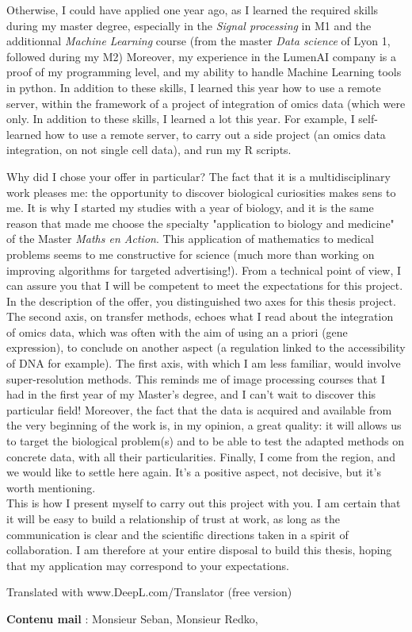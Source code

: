 \documentclass[a4paper,12pt]{article}
\begin{document}
Otherwise, I could have applied one year ago, as I learned the required skills during my master degree, especially in the \textit{Signal processing} in M1 and the additionnal \textit{Machine Learning} course (from the master \textit{Data science} of Lyon 1, followed during my M2)
Moreover, my experience in the LumenAI company is a proof of my programming level, and my ability to handle Machine Learning tools in python. In addition to these skills, I learned this year how to use a remote server, within the framework of a project of integration of omics data (which were only.
In addition to these skills, I learned a lot this year. For example, I self-learned how to use a remote server, to carry out a side project (an omics data integration, on not single cell data), and run my R scripts. 


Why did I chose your offer in particular? The fact that it is a multidisciplinary work pleases me: the opportunity to discover biological curiosities makes sens to me. It is why I started my studies with a year of biology, and it is the same reason that made me choose the specialty "application to biology and medicine" of the Master \textit{Maths en Action}. This application of mathematics to medical problems seems to me constructive for science (much more than working on improving algorithms for targeted advertising!). 
From a technical point of view, I can assure you that I will be competent to meet the expectations for this project. In the description of the offer, you distinguished two axes for this thesis project. The second axis, on transfer methods, echoes what I read about the integration of omics data, which was often with the aim of using an a priori (gene expression), to conclude on another aspect (a regulation linked to the accessibility of DNA for example). The first axis, with which I am less familiar, would involve super-resolution methods. This reminds me of image processing courses that I had in the first year of my Master's degree, and I can't wait to discover this particular field! %
%
Moreover, the fact that the data is acquired and available from the very beginning of the work is, in my opinion, a great quality: it will allows us to target the biological problem(s) and to be able to test the adapted methods on concrete data, with all their particularities. Finally, I come from the region, and we would like to settle here again. It's a positive aspect, not decisive, but it's worth mentioning. 
\\
%

This is how I present myself to carry out this project with you. I am certain that it will be easy to build a relationship of trust at work, as long as the communication is clear and the scientific directions taken in a spirit of collaboration. I am therefore at your entire disposal to build this thesis, hoping that my application may correspond to your expectations. 
%



Translated with www.DeepL.com/Translator (free version)


\hspace{3cm}

\textbf{Contenu mail} : Monsieur Seban, Monsieur Redko, 
\end{document}
